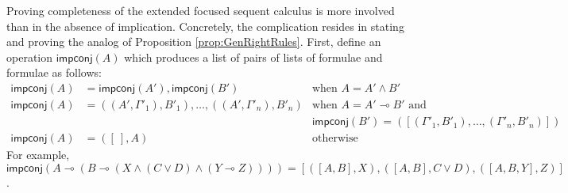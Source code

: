 \documentclass[submission,copyright,creativecommons]{eptcs}
\theoremstyle{definition}
\newcommand{\lolli}{\multimap}
\newcommand{\impconj}[1]{\mathsf{impconj} (#1)}
\newcommand{\proofbox}[1]{\begin{tabular}{l} #1 \end{tabular}}
\newcommand\niccolo[1]{\mbox{}
{\marginpar{\color{red}NV}}
{\sf\noindent\color{red}#1}}%
\begin{document}



Proving completeness of the extended focused sequent calculus is more involved than in the absence of implication. Concretely, the complication resides in stating and proving the analog of Proposition \ref{prop:GenRightRules}. First, define an operation $\mathsf{impconj}(A)$ which produces a list of pairs of lists of formulae and formulae as follows: 
\begin{displaymath}
  \begin{array}{rll}
    \impconj{A} &= \impconj{A'} , \impconj{B'} &\text{when } A = A' \land B'
    \\
    \impconj{A} &= ((A' , \Gamma'_1) , B'_1) , \dots , ((A' , \Gamma'_n) , B'_n) &\text{when } A = A' \lolli B' \text{ and}
    \\
    & &\impconj{B'} = ([(\Gamma'_1 , B'_1) , \dots , (\Gamma'_n , B'_n)])
    \\
    \impconj{A} &= ([\ ] , A) &\text{otherwise}
  \end{array}
\end{displaymath}
For example, $\impconj{A \lolli (B \lolli (X \land (C \lor D) \land (Y \lolli Z)))} = [([A , B] , X) , ([A , B] , C \lor D) , ([A , B , Y] , Z)]$.
\end{document}
